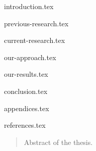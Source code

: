 \documentclass[a4paper,11px]{article}
\begin{document}
\newpage


\setcounter{secnumdepth}{2}
\setcounter{tocdepth}{2}
\tableofcontents

\newpage


\listoffigures

\newpage
 
 

\newpage

{introduction.tex}

\newpage


{previous-research.tex}

\newpage


{current-research.tex}

\newpage


{our-approach.tex}

\newpage



{our-results.tex}

\newpage



{conclusion.tex}

\newpage



{appendices.tex}

\newpage




{references.tex}

\newpage



\begin{latin}
\begin{abstract}
Abstract of the thesis.
\end{abstract}
\end{latin}
\newpage
\end{document}
